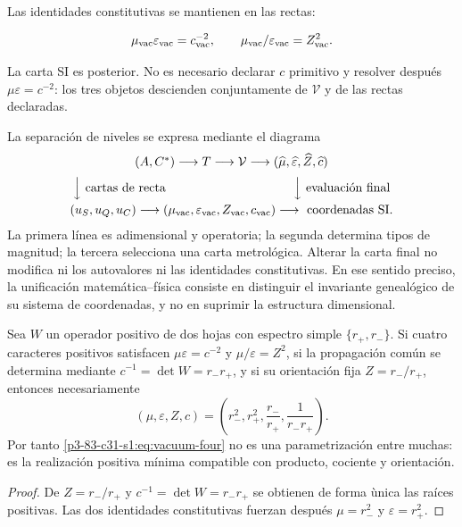 Las identidades constitutivas se mantienen en las rectas:

\begin{equation}
\mu_{\rm vac}\varepsilon_{\rm vac}=c_{\rm vac}^{-2},
\qquad
\mu_{\rm vac}/\varepsilon_{\rm vac}=Z_{\rm vac}^2.
\end{equation}

La carta SI es posterior. No es necesario declarar \(c\) primitivo y resolver despu\'es \(\mu\varepsilon=c^{-2}\): los tres objetos descienden conjuntamente de \(\mathcal V\) y de las rectas declaradas.

La separaci\'on de niveles se expresa mediante el diagrama
\[
\begin{array}{c}
(A,C^*)\longrightarrow T\longrightarrow\mathcal V
\longrightarrow
(\widehat\mu,\widehat\varepsilon,\widehat Z,\widehat c)
\\[2mm]
\Big\downarrow\text{ cartas de recta}\hspace{36mm}
\Big\downarrow\text{ evaluaci\'on final}
\\[2mm]
(u_S,u_Q,u_C)\longrightarrow
(\mu_{\rm vac},\varepsilon_{\rm vac},Z_{\rm vac},c_{\rm vac})
\longrightarrow\text{ coordenadas SI}.
\end{array}
\]
La primera l\'inea es adimensional y operatoria; la segunda determina tipos de
magnitud; la tercera selecciona una carta metrol\'ogica. Alterar la carta final
no modifica ni los autovalores ni las identidades constitutivas. En ese
sentido preciso, la unificaci\'on matem\'atica--f\'isica consiste en distinguir
el invariante geneal\'ogico de su sistema de coordenadas, y no en suprimir la
estructura dimensional.

\begin{proposition}
Sea \(W\) un operador positivo de dos hojas con espectro simple
\(\{r_+,r_-\}\). Si cuatro caracteres positivos satisfacen
\(\mu\varepsilon=c^{-2}\) y \(\mu/\varepsilon=Z^2\), si la propagaci\'on
com\'un se determina mediante \(c^{-1}=\det W=r_-r_+\), y si su orientaci\'on
fija \(Z=r_-/r_+\), entonces necesariamente
\[
(\mu,\varepsilon,Z,c)
=\left(r_-^2,r_+^2,\frac{r_-}{r_+},\frac1{r_-r_+}\right).
\]
Por tanto \cref{p3-83-c31-s1:eq:vacuum-four} no es una parametrizaci\'on entre muchas:
es la realizaci\'on positiva m\'inima compatible con producto, cociente y
orientaci\'on.
\end{proposition}

\begin{proof}
De \(Z=r_-/r_+\) y \(c^{-1}=\det W=r_-r_+\) se obtienen de forma \`unica las
ra\'ices positivas. Las dos identidades constitutivas fuerzan despu\'es
\(\mu=r_-^2\) y \(\varepsilon=r_+^2\).
\end{proof}



